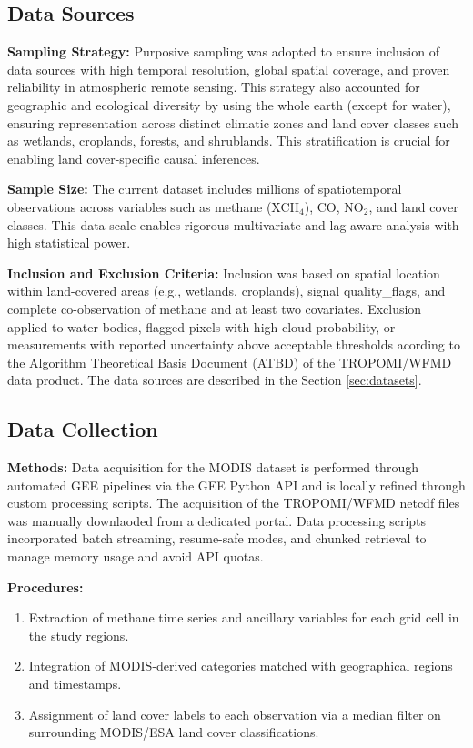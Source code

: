 \subsection{Data Sources}

\textbf{Sampling Strategy:}
Purposive sampling was adopted to ensure inclusion of data sources with high temporal resolution, global spatial coverage, and proven reliability in atmospheric remote sensing. This strategy also accounted for geographic and ecological diversity by using the whole earth (except for water), ensuring representation across distinct climatic zones and land cover classes such as wetlands, croplands, forests, and shrublands. This stratification is crucial for enabling land cover-specific causal inferences.

\textbf{Sample Size:}
The current dataset includes millions of spatiotemporal observations across variables such as methane (XCH$_4$), CO, NO$_2$, and land cover classes. This data scale enables rigorous multivariate and lag-aware analysis with high statistical power.

\textbf{Inclusion and Exclusion Criteria:}
Inclusion was based on spatial location within land-covered areas (e.g., wetlands, croplands), signal \gls{quality_flags}, and complete co-observation of methane and at least two covariates. Exclusion applied to water bodies, flagged pixels with high cloud probability, or measurements with reported uncertainty above acceptable thresholds acording to the Algorithm Theoretical Basis Document (ATBD) of the TROPOMI/WFMD data product. The data sources are described in the Section \ref{sec:datasets}.

\subsection{Data Collection}

\textbf{Methods:}
Data acquisition for the MODIS dataset is performed through automated GEE pipelines via the GEE Python API and is locally refined through custom processing scripts. The acquisition of the TROPOMI/WFMD \gls{netcdf} files was manually downlaoded from a dedicated portal. Data processing scripts incorporated batch streaming, resume-safe modes, and chunked retrieval to manage memory usage and avoid API quotas.

\textbf{Procedures:}
\begin{enumerate}
	\item Extraction of methane time series and ancillary variables for each grid cell in the study regions.
	\item Integration of MODIS-derived categories matched with geographical regions and timestamps.
	\item Assignment of land cover labels to each observation via a median filter on surrounding MODIS/ESA land cover classifications.
\end{enumerate}

